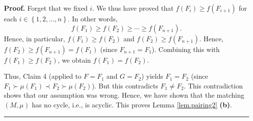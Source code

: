 \documentclass[numbers=enddot,12pt,final,onecolumn,notitlepage]{scrartcl}%
\theoremstyle{definition}
\newenvironment{proof}[1][Proof]{\noindent\textbf{#1.} }{\ \rule{0.5em}{0.5em}}
\begin{document}
\begin{proof}
Forget that we fixed $i$. We thus have proved that $f\left(  F_{i}\right)
\geq f\left(  F_{i+1}\right)  $ for each $i\in\left\{  1,2,\ldots,n\right\}
$. In other words,%
\begin{equation}
f\left(  F_{1}\right)  \geq f\left(  F_{2}\right)  \geq\cdots\geq f\left(
F_{n+1}\right)  . \label{pf.lem.pairing2.chain}%
\end{equation}
Hence, in particular, $f\left(  F_{1}\right)  \geq f\left(  F_{2}\right)  $
and $f\left(  F_{2}\right)  \geq f\left(  F_{n+1}\right)  $. Hence, $f\left(
F_{2}\right)  \geq f\left(  F_{n+1}\right)  =f\left(  F_{1}\right)  $ (since
$F_{n+1}=F_{1}$). Combining this with $f\left(  F_{1}\right)  \geq f\left(
F_{2}\right)  $, we obtain $f\left(  F_{1}\right)  =f\left(  F_{2}\right)  $.

Thus, Claim 4 (applied to $F=F_{1}$ and $G=F_{2}$) yields $F_{1}=F_{2}$ (since
$F_{1}\succ\mu\left(  F_{1}\right)  \prec F_{2}\succ\mu\left(  F_{2}\right)
$). But this contradicts $F_{1}\neq F_{2}$. This contradiction shows that our
assumption was wrong. Hence, we have shown that the matching $\left(
M,\mu\right)  $ has no cycle, i.e., is acyclic. This proves Lemma
\ref{lem.pairing2} \textbf{(b)}.
\end{proof}
\end{document}
